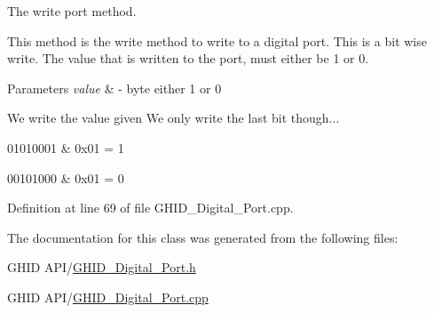 \-The write port method. 

\-This method is the write method to write to a digital port. \-This is a bit wise write. \-The value that is written to the port, must either be 1 or 0.


\begin{DoxyParams}{\-Parameters}
{\em value} & -\/ byte either 1 or 0 \\
\hline
\end{DoxyParams}
\-We write the value given \-We only write the last bit though...
\begin{DoxyItemize}
\item 01010001 \& 0x01 = 1
\item 00101000 \& 0x01 = 0 
\end{DoxyItemize}

\-Definition at line 69 of file \-G\-H\-I\-D\-\_\-\-Digital\-\_\-\-Port.\-cpp.



\-The documentation for this class was generated from the following files\-:\begin{DoxyCompactItemize}
\item 
\-G\-H\-I\-D A\-P\-I/\hyperlink{_g_h_i_d___digital___port_8h}{\-G\-H\-I\-D\-\_\-\-Digital\-\_\-\-Port.\-h}\item 
\-G\-H\-I\-D A\-P\-I/\hyperlink{_g_h_i_d___digital___port_8cpp}{\-G\-H\-I\-D\-\_\-\-Digital\-\_\-\-Port.\-cpp}\end{DoxyCompactItemize}
